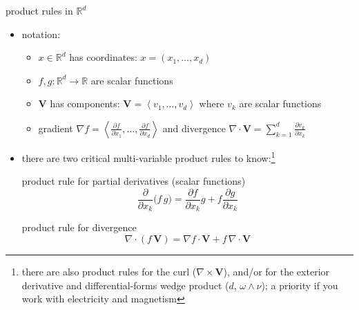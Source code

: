\documentclass[10pt,
               svgnames,
               hyperref={colorlinks,
                         citecolor=DeepPink4,
                         linkcolor=FireBrick,
                         urlcolor=blue},
               usepdftitle=false]{beamer}
\newcommand{\bV}{\mathbf{V}}
\newcommand{\RR}{\mathbb{R}}
\newcommand{\Div}{\nabla\cdot}
\newcommand{\grad}{\nabla}
\begin{document}
\begin{frame}{product rules in $\RR^d$}

\begin{itemize}
\item notation:
    \begin{itemize}
    \item[$\circ$] $x\in\RR^d$ has coordinates: \quad $x = (x_1,\dots,x_d)$
    \item[$\circ$] $f,g:\RR^d\to\RR$ are scalar functions
    \item[$\circ$] $\bV$ has components: \quad $\bV = \left<v_1,\dots,v_d\right>$ \quad where $v_k$ are scalar functions
    \item[$\circ$] gradient $\grad f = \left<\frac{\partial f}{\partial x_1}, \dots,\frac{\partial f}{\partial x_d}\right>$ and divergence $\Div \bV = \sum_{k=1}^d \frac{\partial v_k}{\partial x_k}$
    \end{itemize}
\item there are \alert{two} critical multi-variable product rules to know:\footnote{there are also product rules for the curl ($\nabla\times\bV$), and/or for the exterior derivative and differential-forms wedge product ($d$, $\omega\wedge\nu$); a priority if you work with electricity and magnetism}

\begin{block}{product rule for partial derivatives (scalar functions)}
    $$\frac{\partial}{\partial x_k} \Big(f \,g\Big) = \frac{\partial f}{\partial x_k} g + f \frac{\partial g}{\partial x_k}$$
\end{block}

\begin{block}{product rule for divergence}
    $$\Div (f\,\bV) = \grad f\cdot \bV + f\,\Div \bV$$
\end{block}
\end{itemize}
\end{frame}
\end{document}
